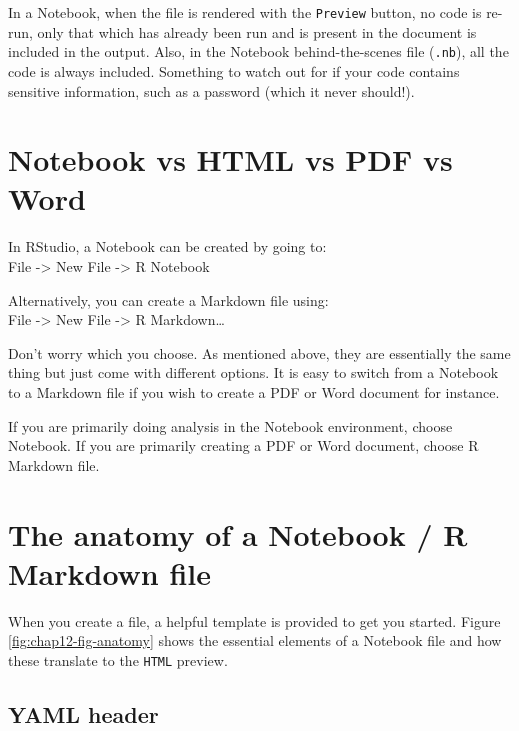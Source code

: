 \documentclass[
  12pt,
  krantz2]{krantz}
\begin{document}
In a Notebook, when the file is rendered with the \texttt{Preview} button, no code is re-run, only that which has already been run and is present in the document is included in the output.
Also, in the Notebook behind-the-scenes file (\texttt{.nb}), all the code is always included.
Something to watch out for if your code contains sensitive information, such as a password (which it never should!).

\hypertarget{notebook-vs-html-vs-pdf-vs-word}{%
\section{Notebook vs HTML vs PDF vs Word}\label{notebook-vs-html-vs-pdf-vs-word}}


In RStudio, a Notebook can be created by going to:\\
File -\textgreater{} New File -\textgreater{} R Notebook

Alternatively, you can create a Markdown file using:\\
File -\textgreater{} New File -\textgreater{} R Markdown\ldots{}

Don't worry which you choose.
As mentioned above, they are essentially the same thing but just come with different options.
It is easy to switch from a Notebook to a Markdown file if you wish to create a PDF or Word document for instance.

If you are primarily doing analysis in the Notebook environment, choose Notebook.
If you are primarily creating a PDF or Word document, choose R Markdown file.

\hypertarget{the-anatomy-of-a-notebook-r-markdown-file}{%
\section{The anatomy of a Notebook / R Markdown file}\label{the-anatomy-of-a-notebook-r-markdown-file}}

When you create a file, a helpful template is provided to get you started.
Figure \ref{fig:chap12-fig-anatomy} shows the essential elements of a Notebook file and how these translate to the \texttt{HTML} preview.

\hypertarget{yaml-header}{%
\subsection{YAML header}\label{yaml-header}}
\end{document}
